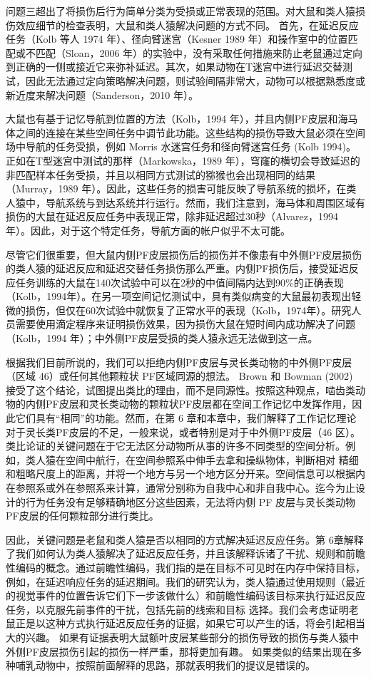 问题三超出了将损伤后行为简单分类为受损或正常表现的范围。对大鼠和类人猿损伤效应细节的检查表明，大鼠和类人猿解决问题的方式不同。 首先，在延迟反应任务（Kolb 等人 1974 年）、径向臂迷宫（Kesner 1989 年）和操作室中的位置匹配或不匹配（Sloan，2006 年）的实验中，没有采取任何措施来防止老鼠通过定向到正确的一侧或接近它来弥补延迟。其次，如果动物在T迷宫中进行延迟交替测试，因此无法通过定向策略解决问题，则试验间隔非常大，动物可以根据熟悉度或新近度来解决问题（Sanderson，2010 年）。
\par 
大鼠也有基于记忆导航到位置的方法（Kolb，1994 年），并且内侧PF皮层和海马体之间的连接在某些空间任务中调节此功能。这些结构的损伤导致大鼠必须在空间场中导航的任务受损，例如 Morris 水迷宫任务和径向臂迷宫任务 (Kolb 1994)。正如在T型迷宫中测试的那样（Markowska，1989 年），穹窿的横切会导致延迟的非匹配样本任务受损，并且以相同方式测试的猕猴也会出现相同的结果（Murray，1989 年）。因此，这些任务的损害可能反映了导航系统的损坏，在类人猿中，导航系统与到达系统并行运行。然而，我们注意到，海马体和周围区域有损伤的大鼠在延迟反应任务中表现正常，除非延迟超过30秒（Alvarez，1994 年）。因此，对于这个特定任务，导航方面的帐户似乎不太可能。
\par 
尽管它们很重要，但大鼠内侧PF皮层损伤后的损伤并不像患有中外侧PF皮层损伤的类人猿的延迟反应和延迟交替任务损伤那么严重。内侧PF损伤后，接受延迟反应任务训练的大鼠在140次试验中可以在2秒的中值间隔内达到90$\%$的正确表现（Kolb，1994年）。在另一项空间记忆测试中，具有类似病变的大鼠最初表现出轻微的损伤，但仅在60次试验中就恢复了正常水平的表现（Kolb，1974年）。研究人员需要使用滴定程序来证明损伤效果，因为损伤大鼠在短时间内成功解决了问题（Kolb，1994 年）；中外侧PF皮层受损的类人猿永远无法做到这一点。
\par 
根据我们目前所说的，我们可以拒绝内侧PF皮层与灵长类动物的中外侧PF皮层（区域 46）或任何其他颗粒状 PF区域同源的想法。 Brown 和 Bowman (2002) 接受了这个结论，试图提出类比的理由，而不是同源性。按照这种观点，啮齿类动物的内侧PF皮层和灵长类动物的颗粒状PF皮层都在空间工作记忆中发挥作用，因此它们具有“相同”的功能。然而，在第 6 章和本章中，我们解释了工作记忆理论对于灵长类PF皮层的不足，一般来说，或者特别是对于中外侧PF皮层（46 区）。类比论证的关键问题在于它无法区分动物所从事的许多不同类型的空间分析。例如，类人猿在空间中航行，在空间参照系中伸手去拿和操纵物体，判断相对 精细和粗略尺度上的距离，并将一个地方与另一个地方区分开来。空间信息可以根据内在参照系或外在参照系来计算，通常分别称为自我中心和非自我中心。迄今为止设计的行为任务没有足够精确地区分这些因素，无法将内侧 PF 皮层与灵长类动物PF皮层的任何颗粒部分进行类比。
\par 
因此，关键问题是老鼠和类人猿是否以相同的方式解决延迟反应任务。第 6章解释了我们如何认为类人猿解决了延迟反应任务，并且该解释诉诸了干扰、规则和前瞻性编码的概念。通过前瞻性编码，我们指的是在目标不可见时在内存中保持目标，例如，在延迟响应任务的延迟期间。我们的研究认为，类人猿通过使用规则（最近的视觉事件的位置告诉它们下一步该做什么）和前瞻性编码该目标来执行延迟反应任务，以克服先前事件的干扰，包括先前的线索和目标 选择。我们会考虑证明老鼠正是以这种方式执行延迟反应任务的证据，如果它可以产生的话，将会引起相当大的兴趣。 如果有证据表明大鼠额叶皮层某些部分的损伤导致的损伤与类人猿中外侧PF皮层损伤引起的损伤一样严重，那将更加有趣。 如果类似的结果出现在多种哺乳动物中，按照前面解释的思路，那就表明我们的提议是错误的。
